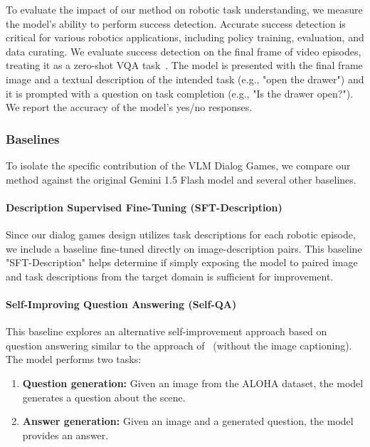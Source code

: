 To evaluate the impact of our method on robotic task understanding, we measure the model's ability to perform success detection. 
Accurate success detection is critical for various robotics applications, including policy training, evaluation, and data curating.
We evaluate success detection on the final frame of video episodes, treating it as a zero-shot VQA task~\citep{du23successvqa}. 
The model is presented with the final frame image and a textual description of the intended task (e.g., "open the drawer") and it is prompted with a question on task completion (e.g., "Is the drawer open?").
We report the accuracy of the model's yes/no responses.

\subsubsection{Baselines}
\label{sec:exps-robotics-baselines}

To isolate the specific contribution of the VLM Dialog Games, we compare our method against the original Gemini 1.5 Flash model and several other baselines.

\paragraph{Description Supervised Fine-Tuning (SFT-Description)}
Since our dialog games design utilizes task descriptions for each robotic episode, we include a baseline fine-tuned directly on image-description pairs.
This baseline "SFT-Description" helps determine if simply exposing the model to paired image and task descriptions from the target domain is sufficient for improvement.

\paragraph{Self-Improving Question Answering (Self-QA)}
This baseline explores an alternative self-improvement approach based on question answering similar to the approach of~\citet{luu2024questioning} (without the image captioning).
The model performs two tasks:
\begin{enumerate}
    \item \textbf{Question generation:} Given an image from the ALOHA dataset, the model generates a question about the scene.
    \item \textbf{Answer generation:} Given an image and a generated question, the model provides an answer.
\end{enumerate}

